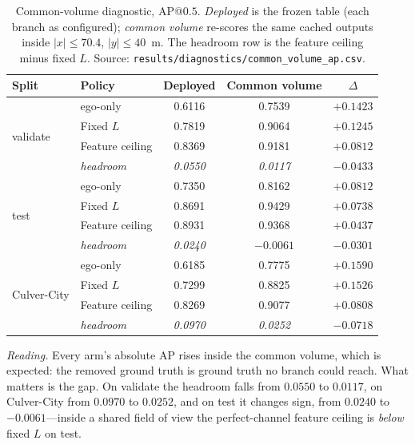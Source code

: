 \documentclass[journal]{IEEEtran}
\begin{document}
\begin{table}[t]
\centering
\footnotesize
\setlength{\tabcolsep}{4pt}
\caption{Common-volume diagnostic, AP@$0.5$. \emph{Deployed} is the frozen table (each branch as
configured); \emph{common volume} re-scores the same cached outputs inside
$|x|\le70.4$, $|y|\le40$~m. The headroom row is the feature ceiling minus fixed $L$.
Source: \texttt{results/diagnostics/common\_volume\_ap.csv}.}
\label{tab:common_volume}
\begin{tabular}{llccc}
\toprule
Split & Policy & Deployed & Common volume & $\Delta$ \\
\midrule
\multirow{4}{*}{validate}
 & ego-only              & 0.6116 & 0.7539 & $+0.1423$ \\
 & Fixed $L$             & 0.7819 & 0.9064 & $+0.1245$ \\
 & Feature ceiling       & 0.8369 & 0.9181 & $+0.0812$ \\
 & \emph{headroom}       & \emph{0.0550} & \emph{0.0117} & \emph{$-0.0433$} \\
\midrule
\multirow{4}{*}{test}
 & ego-only              & 0.7350 & 0.8162 & $+0.0812$ \\
 & Fixed $L$             & 0.8691 & 0.9429 & $+0.0738$ \\
 & Feature ceiling       & 0.8931 & 0.9368 & $+0.0437$ \\
 & \emph{headroom}       & \emph{0.0240} & \emph{$-0.0061$} & \emph{$-0.0301$} \\
\midrule
\multirow{4}{*}{Culver-City}
 & ego-only              & 0.6185 & 0.7775 & $+0.1590$ \\
 & Fixed $L$             & 0.7299 & 0.8825 & $+0.1526$ \\
 & Feature ceiling       & 0.8269 & 0.9077 & $+0.0808$ \\
 & \emph{headroom}       & \emph{0.0970} & \emph{0.0252} & \emph{$-0.0718$} \\
\bottomrule
\end{tabular}
\end{table}

\emph{Reading.} Every arm's absolute AP rises inside the common volume, which is expected: the
removed ground truth is ground truth no branch could reach. What matters is the gap. On validate the
headroom falls from $0.0550$ to $0.0117$, on Culver-City from $0.0970$ to $0.0252$, and on test it
changes sign, from $0.0240$ to $-0.0061$---inside a shared field of view the perfect-channel feature
ceiling is \emph{below} fixed $L$ on test.
\end{document}
